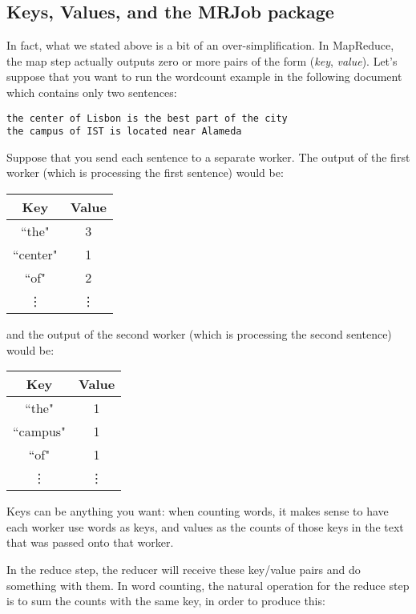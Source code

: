 \subsection{Keys, Values, and the MRJob package}
In fact, what we stated above is a bit of an over-simplification. In MapReduce, the map step actually outputs zero or more pairs of the form (\emph{key}, \emph{value}). Let's suppose that you want to run the wordcount example in the following document which contains only two sentences:

\begin{verbatim}
the center of Lisbon is the best part of the city
the campus of IST is located near Alameda
\end{verbatim}

Suppose that you send each sentence to a separate worker. The output of the first worker (which is processing the first sentence) would be:

\begin{center}
\begin{tabular}{|c|c|}
\hline
Key & Value \\
\hline\hline
``the" & 3 \\
``center" & 1 \\
``of" & 2\\
\vdots & \vdots \\
\end{tabular}
\end{center}

and the output of the second worker (which is processing the second sentence) would be:

\begin{center}
\begin{tabular}{|c|c|}
\hline
Key & Value \\
\hline\hline
``the" & 1 \\
``campus" & 1 \\
``of" & 1\\
\vdots & \vdots \\
\end{tabular}
\end{center}

Keys can be anything you want: when counting words, it makes sense to have each worker use words as keys, and values as the counts of those keys in the text that was passed onto that worker.

In the reduce step, the reducer will receive these key/value pairs and do something with them. In word counting, the natural operation for the reduce step is to sum the counts with the same key, in order to produce this:

